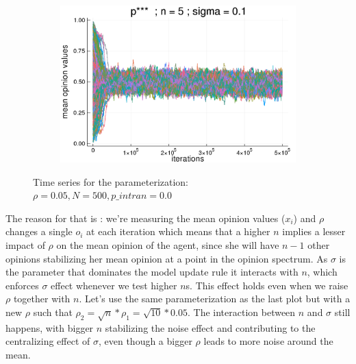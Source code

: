 \documentclass{article}
\begin{document}
\begin{figure}[H]
\begin{subfigure}[b]{0.5\textwidth}
        \includegraphics[width=\textwidth]{img/compare-ps/Poodlcalculatep***n5-rho005-sigma01-00intrans.png}
      \end{subfigure}
      \label{fig:tseries2}
      \caption{Time series for the parameterization: \(\rho = 0.05, N = 500,
       p\_intran = 0.0\)}
    \end{figure}

    The reason for that is : we're measuring the mean opinion values (\(x_i\))
    and \(\rho\) changes a single \(o_i\) at each iteration which means that a
    higher \(n\) implies a lesser impact of \(\rho\) on the mean opinion of the
    agent, since she will have \(n-1\) other opinions stabilizing her mean
    opinion at a point in the opinion spectrum. As \(\sigma\) is the parameter
    that dominates the model update rule it interacts with \(n\), which enforces
    \(\sigma\) effect whenever we test higher \(n\)s. This effect holds even
    when we raise \(\rho\) together with \(n\). Let's use the same
    parameterization as the last plot but with a new \(\rho\) such that \(\rho_2
    = \sqrt{n} * \rho_1 = \sqrt{10} * 0.05\). The interaction between \(n\) and
    \(\sigma\) still happens, with bigger \(n\) stabilizing the noise effect and
    contributing to the centralizing effect of \(\sigma\), even though a bigger
    \(\rho\) leads to more noise around the mean. 
\end{document}
